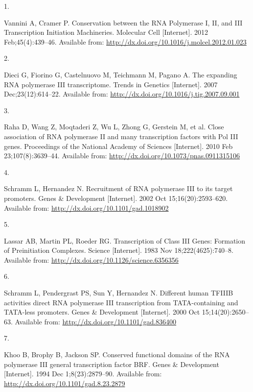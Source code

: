 \documentclass[
  12pt,
]{article}
\newlength{\cslhangindent}
\newlength{\csllabelwidth}
\newlength{\cslentryspacingunit} %
\newenvironment{CSLReferences}[2] %
 {%
  \setlength{\parindent}{0pt}
  \ifodd #1
  \let\oldpar\par
  \def\par{\hangindent=\cslhangindent\oldpar}
  \fi
  \setlength{\parskip}{#2\cslentryspacingunit}
 }%
 {}
\newcommand{\CSLLeftMargin}[1]{\parbox[t]{\csllabelwidth}{#1}}
\newcommand{\CSLRightInline}[1]{\parbox[t]{\linewidth - \csllabelwidth}{#1}\break}
\begin{document}
\hypertarget{refs}{}
\begin{CSLReferences}{0}{0}
\leavevmode{}%
\CSLLeftMargin{1. }%
\CSLRightInline{Vannini A, Cramer P. Conservation between the RNA Polymerase I, II, and III Transcription Initiation Machineries. Molecular Cell {[}Internet{]}. 2012 Feb;45(4):439--46. Available from: \url{http://dx.doi.org/10.1016/j.molcel.2012.01.023}}

\leavevmode{}%
\CSLLeftMargin{2. }%
\CSLRightInline{Dieci G, Fiorino G, Castelnuovo M, Teichmann M, Pagano A. The expanding RNA polymerase III transcriptome. Trends in Genetics {[}Internet{]}. 2007 Dec;23(12):614--22. Available from: \url{http://dx.doi.org/10.1016/j.tig.2007.09.001}}

\leavevmode{}%
\CSLLeftMargin{3. }%
\CSLRightInline{Raha D, Wang Z, Moqtaderi Z, Wu L, Zhong G, Gerstein M, et al. Close association of RNA polymerase II and many transcription factors with Pol III genes. Proceedings of the National Academy of Sciences {[}Internet{]}. 2010 Feb 23;107(8):3639--44. Available from: \url{http://dx.doi.org/10.1073/pnas.0911315106}}

\leavevmode{}%
\CSLLeftMargin{4. }%
\CSLRightInline{Schramm L, Hernandez N. Recruitment of RNA polymerase III to its target promoters. Genes \& Development {[}Internet{]}. 2002 Oct 15;16(20):2593--620. Available from: \url{http://dx.doi.org/10.1101/gad.1018902}}

\leavevmode{}%
\CSLLeftMargin{5. }%
\CSLRightInline{Lassar AB, Martin PL, Roeder RG. Transcription of Class III Genes: Formation of Preinitiation Complexes. Science {[}Internet{]}. 1983 Nov 18;222(4625):740--8. Available from: \url{http://dx.doi.org/10.1126/science.6356356}}

\leavevmode{}%
\CSLLeftMargin{6. }%
\CSLRightInline{Schramm L, Pendergrast PS, Sun Y, Hernandez N. Different human TFIIIB activities direct RNA polymerase III transcription from TATA-containing and TATA-less promoters. Genes \& Development {[}Internet{]}. 2000 Oct 15;14(20):2650--63. Available from: \url{http://dx.doi.org/10.1101/gad.836400}}

\leavevmode{}%
\CSLLeftMargin{7. }%
\CSLRightInline{Khoo B, Brophy B, Jackson SP. Conserved functional domains of the RNA polymerase III general transcription factor BRF. Genes \& Development {[}Internet{]}. 1994 Dec 1;8(23):2879--90. Available from: \url{http://dx.doi.org/10.1101/gad.8.23.2879}}


\end{CSLReferences}
\end{document}
